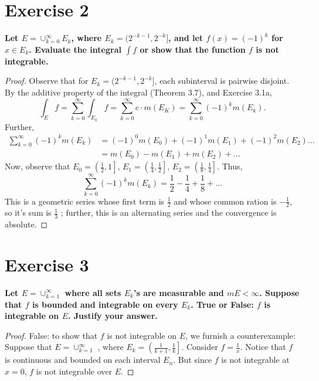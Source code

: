 \documentclass[paper=a4, fontsize=11pt]{scrartcl} %
\begin{document}
\section*{Exercise 2}
\boldmath
\textbf{Let $E = \cup_{k=0}^{\infty}E_k$, where $E_k = (2^{-k-1}, 2^{-k}]$, and let $f(x) = (-1)^k$ for $x \in E_k$.  Evaluate the integral $\int f$ or show that the function $f$ is not integrable.}
\unboldmath
\begin{proof}
Observe that for $E_k = (2^{-k-1}, 2^{-k}]$, each subinterval is pairwise disjoint.  By the additive property of the integral (Theorem $3.7$), and Exercise 3.1a,
$$\int_E f = \sum_{k = 0}^{\infty} \int_{E_k} f = \sum_{k=0}^{\infty} c \cdot m(E_K) = \sum_{k=0}^{\infty} (-1)^k m(E_k).$$
\newline
Further,  
\begin{align*}
\sum_{k=0}^{\infty} (-1)^k m(E_k) &= (-1)^0 m(E_0) + (-1)^1 m(E_1) + (-1)^2 m(E_2) ...
\\ &=  m(E_0) - m(E_1) + m(E_2) + \dots
\end{align*}
Now, observe that $E_0 = \left( \frac{1}{2}, 1 \right]$, $E_1 = \left( \frac{1}{4}, \frac{1}{2} \right]$, $E_2 = \left( \frac{1}{8},\frac{1}{4} \right]$.
\newline
Thus, $$\sum_{k=0}^{\infty} (-1)^k m(E_k)  =  \frac{1}{2} - \frac{1}{4} + \frac{1}{8} + \dots$$
This is a geometric series whose first term is $\frac{1}{2}$ and whose common ration is $- \frac{1}{2}$, so it's sum is $\frac{1}{3}$ ; further, this is an alternating series and the convergence is absolute.
\end{proof}
\section*{Exercise 3}
\boldmath
\textbf{Let $E = \cup_{k=1}^{\infty}$ where all sets $E_k$'s are measurable and $mE < \infty$.  Suppose that $f$ is bounded and integrable on every $E_k$.
\newline
True or False:  $f$ is integrable on $E$.  Justify your answer.}
\unboldmath
\begin{proof}
False:  to show that $f$ is not integrable on $E$, we furnish a counterexample:  
\newline
Suppose that $E = \cup_{k=1}^{\infty}$ , where $E_k = \left ( \frac{1}{k+1}, \frac{1}{k} \right ]$.  
\newline Consider $f = \frac{1}{x}$.  Notice that $f$ is continuous and bounded on each interval $E_n$.  But since $f$ is not integrable at $x=0$, $f$ is not integrable over $E$.
\end{proof}
\end{document}
